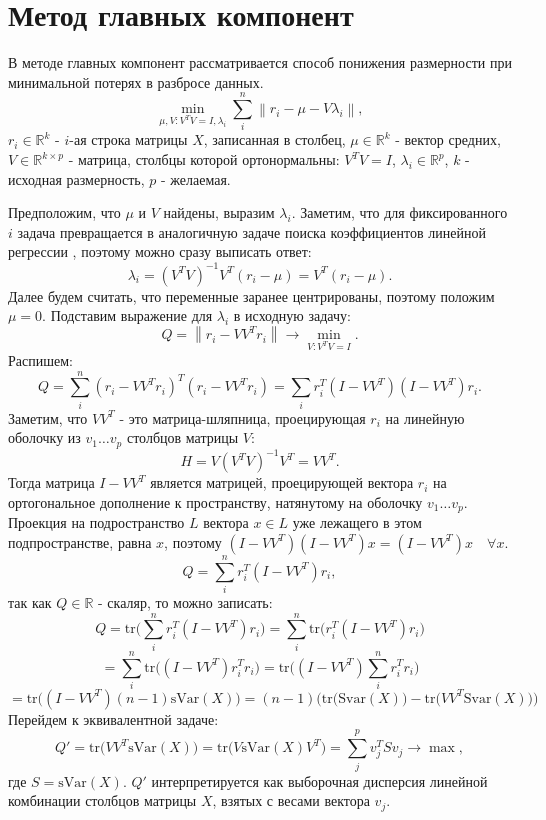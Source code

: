 \documentclass[12pt]{article} %
\theoremstyle{definition} %
\begin{document}
\section{Метод главных компонент}
В методе главных компонент рассматривается способ понижения размерности при минимальной потерях в разбросе данных.
$$\min_{\mu, V: V^TV=I, \lambda_i} \sum_{i}^n \left\|r_i - \mu - V\lambda_i \right\|, $$
$r_i \in \mathbb{R}^k$ - $i$-ая строка матрицы $X$, записанная в столбец,
$\mu \in \mathbb{R}^k$ - вектор средних, $V \in \mathbb{R}^{k \times p}$ - матрица, столбцы которой ортонормальны: $V^TV=I$, $\lambda_i \in \mathbb{R}^p$, $k$ - исходная размерность, $p$ - желаемая.

Предположим, что $\mu$ и $V$ найдены, выразим $\lambda_i$. Заметим, что для фиксированного $i$ задача превращается в аналогичную задаче поиска коэффициентов линейной регрессии , поэтому можно сразу выписать ответ:
$$\lambda_i = (V^TV)^{-1}V^T(r_i-\mu) = V^T(r_i-\mu).$$
Далее будем считать, что переменные заранее центрированы, поэтому положим $\mu=0$.
Подставим выражение для $\lambda_i$ в исходную задачу:
$$Q = \left\| r_i - VV^T r_i \right\| \to \min_{V: V^TV=I} .$$
Распишем:
$$Q = \sum_i^n (r_i - VV^Tr_i)^T (r_i - VV^Tr_i) = 
\sum_i r_i^T (I-VV^T)(I-VV^T)r_i.$$
Заметим, что $VV^T$ - это матрица-шляпница, проецирующая $r_i$ на линейную оболочку из $v_1 \dots v_p$ столбцов матрицы $V$:
$$H = V (V^TV)^{-1} V^T = VV^T.$$
Тогда матрица $I-VV^T$ является матрицей, проецирующей вектора $r_i$ на ортогональное дополнение к пространству, натянутому на оболочку $v_1 \dots v_p$.
Проекция на подространство $L$ вектора $x \in L$ уже лежащего в этом подпространстве, равна $x$, поэтому  $(I-VV^T)(I-VV^T)x=(I-VV^T)x \quad \forall x$.
$$Q = \sum_i^n r_i^T(I - VV^T)r_i,$$
так как $Q \in \mathbb{R}$ - скаляр, то можно записать:
$$Q = \text{tr} \bigg( \sum_i^n r_i^T(I - VV^T)r_i \bigg) =
\sum_i^n \text{tr} \bigg( r_i^T(I - VV^T)r_i \bigg) $$
$$=\sum_i^n \text{tr} \bigg( (I - VV^T)r_i^T r_i \bigg) =
\text{tr}   \bigg( (I - VV^T) \sum_i^n r_i^T r_i \bigg)$$
$$=\text{tr}   \bigg( (I - VV^T)(n-1) \text{sVar}(X) \bigg)
=(n-1) \bigg( \text{tr} \big(\text{Svar}(X)\big) -
\text{tr}\big(VV^T \text{Svar}(X)\big) \bigg)$$
Перейдем к эквивалентной задаче:
$$Q' = \text{tr} \big( VV^T \text{sVar}(X) \big) =
\text{tr} \big( V \text{sVar}(X) V^T \big) = \sum_{j}^p v_j^T S v_j \to \max,$$
где $S = \text{sVar}(X)$. $Q'$ интерпретируется как выборочная дисперсия линейной комбинации столбцов матрицы $X$, взятых с весами вектора $v_j$.
\end{document}
